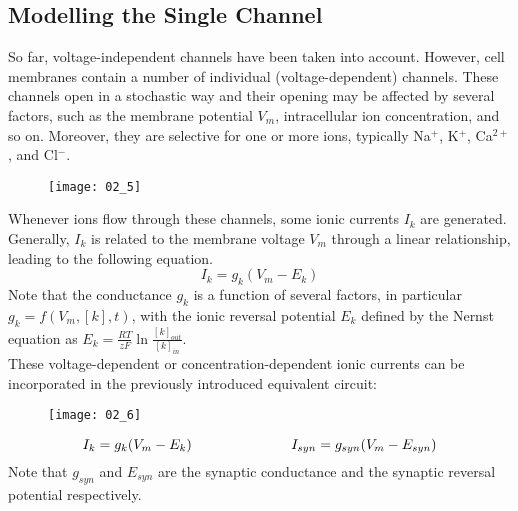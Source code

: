 \subsection{Modelling the Single Channel}
So far, voltage-independent channels have been taken into account. However, cell membranes
contain a number of individual (voltage-dependent) channels. These channels open in a stochastic
way and their opening may be affected by several factors, such as the membrane potential \(V_{m}\),
intracellular ion concentration, and so on. Moreover, they are selective for one or more ions,
typically Na\({}^{+}\), K\({}^{+}\), Ca\({}^{2+}\), and Cl\({}^{-}\).
\begin{figure}[H]
    \texttt{[image: 02\_5]}
    \centering
\end{figure}
Whenever ions flow through these channels, some ionic currents \(I_{k}\) are generated. Generally,
\(I_{k}\) is related to the membrane voltage \(V_{m}\) through a linear relationship, leading
to the following equation.
\begin{equation*}
    I_{k}=g_{k}(V_{m}-E_{k})
\end{equation*}
Note that the conductance \(g_{k}\) is a function of several factors, in particular
\(g_{k}=f(V_{m},[k],t)\), with the ionic reversal potential \(E_{k}\) defined by the Nernst
equation as \(E_{k}=\frac{RT}{zF}\ln{\frac{[k]_{out}}{[k]_{in}}}\).\\
These voltage-dependent or concentration-dependent ionic currents can be incorporated in the
previously introduced equivalent circuit:
\begin{figure}[H]
    \texttt{[image: 02\_6]}
    \centering
\end{figure}
\begin{equation*}
    I_{k}=g_{k}(V_{m}-E_{k})
    \hspace{2.5cm}
    I_{syn}=g_{syn}(V_{m}-E_{syn})
\end{equation*}
Note that \(g_{syn}\) and \(E_{syn}\) are the synaptic conductance and the synaptic reversal
potential respectively.
